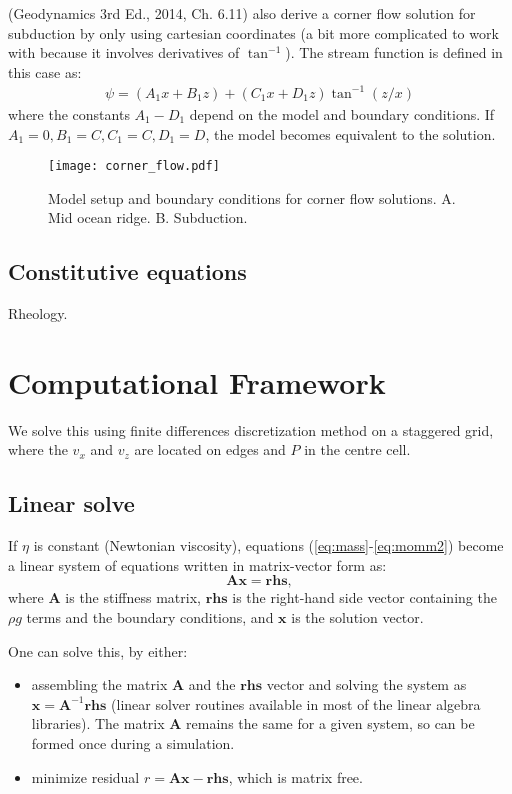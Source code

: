 \documentclass[a4paper,11pt]{article}
\begin{document}
\citet{Turcotte2014} (Geodynamics 3rd Ed., 2014, Ch. 6.11) also derive a corner flow solution for subduction by only using cartesian coordinates (a bit more complicated to work with because it involves derivatives of $\tan^{-1}$). The stream function is defined in this case as:
\begin{align}
\psi = (A_1x+B_1z)+(C_1x+D_1z)\tan^{-1}(z/x)
\end{align}
where the constants $A_1-D_1$ depend on the model and boundary conditions. If $A_1=0, B_1=C, C_1=C, D_1=D$, the model becomes equivalent to the \citet{Spiegelman1987} solution.

\begin{figure}
\begin{center}
\noindent \texttt{[image: corner\_flow.pdf]} 
\caption{Model setup and boundary conditions for corner flow solutions. A. Mid ocean ridge. B. Subduction.}
\label{fig:corner_flow}
  \end{center}
\end{figure}

\subsection{Constitutive equations}
Rheology. 

\section{Computational Framework}

We solve this using finite differences discretization method on a staggered grid, where the $v_x$ and $v_z$ are located on edges and $P$ in the centre cell.

\subsection{Linear solve}
If $\eta$ is constant (Newtonian viscosity), equations (\ref{eq:mass}-\ref{eq:momm2}) become a linear system of equations written in matrix-vector form as:
\begin{equation}
\textbf{A} \textbf{x} = \textbf{rhs},
\end{equation}
where $\textbf{A}$ is the stiffness matrix, $\textbf{rhs}$ is the right-hand side vector containing the $\rho g$ terms and the boundary conditions, and $\textbf{x} $ is the solution vector. 

One can solve this, by either:
\begin{itemize} 
\item assembling the matrix $\textbf{A}$ and the $\textbf{rhs}$ vector and solving the system as $\textbf{x} = \textbf{A}^{-1}\textbf{rhs}$ (linear solver routines available in most of the linear algebra libraries). The matrix $\textbf{A}$ remains the same for a given system, so can be formed once during a simulation. 
\item minimize residual $r = \textbf{A} \textbf{x} - \textbf{rhs}$, which is matrix free.
\end{itemize}
\end{document}
